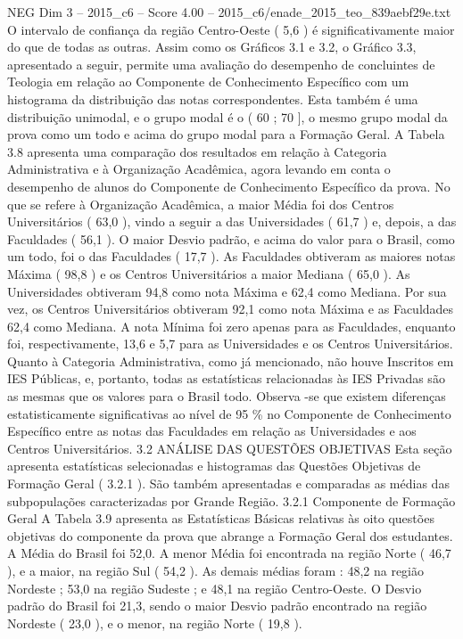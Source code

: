 \begin{textsample}{NEG Dim 3 – 2015\_c6 – Score 4.00 – 2015\_c6/enade\_2015\_teo\_839aebf29e.txt}
O intervalo de confiança da região Centro-Oeste ( 5,6 ) é significativamente maior do que de todas as outras.
Assim como os Gráficos 3.1 e 3.2, o Gráfico 3.3, apresentado a seguir, permite uma avaliação do desempenho de concluintes de Teologia em relação ao Componente de Conhecimento Específico com um histograma da distribuição das notas correspondentes.
Esta também é uma distribuição unimodal, e o grupo modal é o ( 60 ; 70 ], o mesmo grupo modal da prova como um todo e acima do grupo modal para a Formação Geral.
A Tabela 3.8 apresenta uma comparação dos resultados em relação à Categoria Administrativa e à Organização Acadêmica, agora levando em conta o desempenho de alunos do Componente de Conhecimento Específico da prova.
No que se refere à Organização Acadêmica, a maior Média foi dos Centros Universitários ( 63,0 ), vindo a seguir a das Universidades ( 61,7 ) e, depois, a das Faculdades ( 56,1 ).
O maior Desvio padrão, e acima do valor para o Brasil, como um todo, foi o das Faculdades ( 17,7 ).
As Faculdades obtiveram as maiores notas Máxima ( 98,8 ) e os Centros Universitários a maior Mediana ( 65,0 ).
As Universidades obtiveram 94,8 como nota Máxima e 62,4 como Mediana.
Por sua vez, os Centros Universitários obtiveram 92,1 como nota Máxima e as Faculdades 62,4 como Mediana.
A nota Mínima foi zero apenas para as Faculdades, enquanto foi, respectivamente, 13,6 e 5,7 para as Universidades e os Centros Universitários.
Quanto à Categoria Administrativa, como já mencionado, não houve Inscritos em IES Públicas, e, portanto, todas as estatísticas relacionadas às IES Privadas são as mesmas que os valores para o Brasil todo.
Observa -se que existem diferenças estatisticamente significativas ao nível de 95 \% no Componente de Conhecimento Específico entre as notas das Faculdades em relação as Universidades e aos Centros Universitários. 3.2 ANÁLISE DAS QUESTÕES OBJETIVAS Esta seção apresenta estatísticas selecionadas e histogramas das Questões Objetivas de Formação Geral ( 3.2.1 ).
São também apresentadas e comparadas as médias das subpopulações caracterizadas por Grande Região. 3.2.1 Componente de Formação Geral A Tabela 3.9 apresenta as Estatísticas Básicas relativas às oito questões objetivas do componente da prova que abrange a Formação Geral dos estudantes.
A Média do Brasil foi 52,0.
A menor Média foi encontrada na região Norte ( 46,7 ), e a maior, na região Sul ( 54,2 ).
As demais médias foram : 48,2 na região Nordeste ; 53,0 na região Sudeste ; e 48,1 na região Centro-Oeste.
O Desvio padrão do Brasil foi 21,3, sendo o maior Desvio padrão encontrado na região Nordeste ( 23,0 ), e o menor, na região Norte ( 19,8 ).

\end{textsample}
